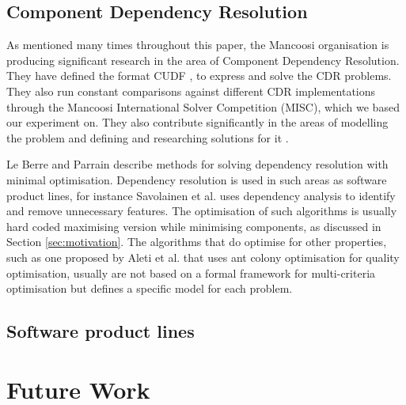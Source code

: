 \subsection{Component Dependency Resolution}

As mentioned many times throughout this paper, 
the Mancoosi organisation is producing significant research in the area of Component Dependency Resolution.
They have defined the format CUDF \citep{treinen2009common}, to express and solve the CDR problems.
They also run constant comparisons against different CDR implementations through the Mancoosi International Solver Competition (MISC),
which we based our experiment on.
They also contribute significantly in the areas of modelling the problem \citep{Cosmo2010} 
and defining and researching solutions for it \citep{Trezentos2010}.

Le Berre and Parrain \citep{Berre2008} describe methods for solving dependency resolution with minimal optimisation.
Dependency resolution is used in such areas as software product lines,
for instance Savolainen et al. \citep{savolainen_analyzing_2007} uses dependency analysis to identify and remove unnecessary features.
The optimisation of such algorithms is usually hard coded maximising version while minimising components, 
as discussed in Section \ref{sec:motivation}.
The algorithms that do optimise for other properties, 
such as one proposed by Aleti et al. \citep{Aleti2009} that uses ant colony optimisation for quality optimisation,
usually are not based on a formal framework for multi-criteria optimisation but defines a specific model for each problem.

\subsection{Software product lines}


\section{Future Work}



